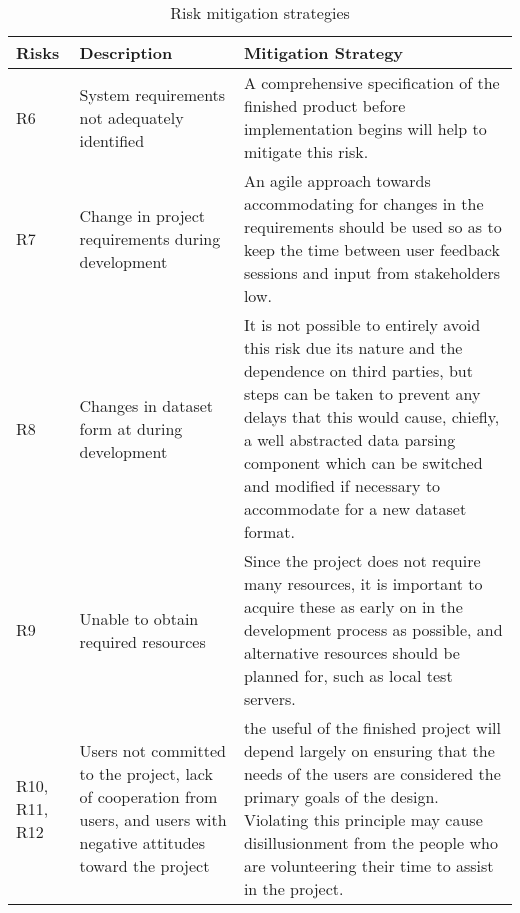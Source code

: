 \begin{table}[H]
\centering
\begin{tabular}{ | l | p{4cm} | p{10.5cm} | }
\hline
Risks & Description & Mitigation Strategy\\
\hline

R6 & System requirements not adequately identified & A comprehensive
specification of the finished product before implementation begins will help to
mitigate this risk.\\

R7 & Change in project requirements during development & An agile approach
towards accommodating for changes in the requirements should be used so as to
keep the time between user feedback sessions and input from stakeholders low.\\

R8 & Changes in dataset form at during development & It is not possible to
entirely avoid this risk due its nature and the dependence on third parties, but
steps can be taken to prevent any delays that this would cause, chiefly, a well
abstracted data parsing component which can be switched and modified if
necessary to accommodate for a new dataset format.\\

R9 & Unable to obtain required resources & Since the project does not require
many resources, it is important to acquire these as early on in the development
process as possible, and alternative resources should be planned for, such as
local test servers.\\

R10, R11, R12 & Users not committed to the project, lack of cooperation from
  users, and users with negative attitudes toward the project & the useful of
  the finished project will depend largely on ensuring that the needs of the
  users are considered the primary goals of the design. Violating this principle
  may cause disillusionment from the people who are volunteering their time to
  assist in the project.\\

\hline
\end{tabular}
\caption{Risk mitigation strategies}
\label{tab:mitigation-strategies}
\end{table}

